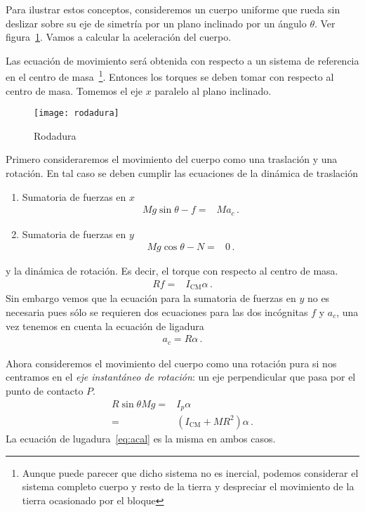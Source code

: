 Para ilustrar estos conceptos, consideremos un cuerpo uniforme que
rueda sin deslizar sobre su eje de simetría por un plano inclinado por
un ángulo $\theta$. Ver figura~\ref{fig:rodadura}. Vamos a calcular la aceleración del cuerpo.

Las ecuación de movimiento será obtenida con respecto a un sistema de
referencia en el centro de masa~\footnote{Aunque puede parecer que
  dicho sistema no es inercial, podemos considerar el sistema completo
  cuerpo y resto de la tierra y despreciar el movimiento de la tierra
  ocasionado por el bloque}. 
Entonces los torques se deben tomar con respecto al centro de
masa. Tomemos el eje $x$ paralelo al plano inclinado. 

\begin{frame}
\begin{figure}
  \centering
  \texttt{[image: rodadura]}
  \caption{Rodadura}
  \label{fig:rodadura}
\end{figure}
\end{frame}

Primero consideraremos el movimiento del cuerpo como una traslación y
una rotación. En tal caso se deben cumplir las ecuaciones de la
dinámica de traslación
\begin{enumerate}
\item Sumatoria de fuerzas en $x$ 
  \begin{align}
    \label{eq:fxcil}
    Mg\sin\theta-f=&M a_c\,.
  \end{align}
\item Sumatoria de fuerzas en $y$
  \begin{align*}
    Mg\cos\theta-N=&0\,.
  \end{align*}
\end{enumerate}
y la dinámica de rotación. Es decir, el torque con respecto al centro de masa. 
\begin{align}
  \label{eq:tcmcil}
  Rf=&I_{\text{CM}}\alpha\,.
\end{align}
Sin embargo vemos que la ecuación para la sumatoria de fuerzas en $y$
no es necesaria pues sólo se requieren dos ecuaciones para las dos
incógnitas $f$ y $a_c$, una vez tenemos en cuenta la ecuación de
ligadura
\begin{align}
  \label{eq:acal}
  a_c=R\alpha\,.
\end{align}

Ahora consideremos el movimiento del cuerpo como una rotación pura si
nos centramos en el \emph{eje instantáneo de rotación}: un eje
perpendicular que pasa por el punto de contacto $P$.
\begin{align*}
  R\sin\theta M g=&I_p\alpha\nonumber\\
  =&(I_{\text{CM}}+MR^2)\alpha\,.
\end{align*}
La ecuación de lugadura~\eqref{eq:acal} es la misma en ambos casos. 


